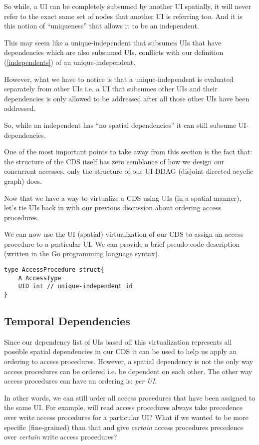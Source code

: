 So while, a UI can be completely subsumed by another UI spatially, it will never refer to the exact same set of nodes that another UI is referring too. And it is this notion of ``uniqueness'' that allows it to be an independent.

This may seem like a unique-independent that subsumes UIs that have dependencies which are also subsumed UIs, conflicts with our definition (\ref{independents}) of an unique-independent.

However, what we have to notice is that a unique-independent is evaluated separately from other UIs i.e. a UI that subsumes other UIs and their dependencies is only allowed to be addressed after all those other UIs have been addressed.

So, while an independent has ``no spatial dependencies'' it can still subsume UI-dependencies. 

One of the most important points to take away from this section is the fact that: the structure of the CDS itself has zero semblance of how we design our concurrent accesses, only the structure of our UI-DDAG (disjoint directed acyclic graph) does.

Now that we have a way to virtualize a CDS using UIs (in a spatial manner), let's tie UIs back in with our previous discussion about ordering access procedures.

We can now use the UI (spatial) virtualization of our CDS to assign an access procedure to a particular UI. We can provide a brief pseudo-code description (written in the Go programming language syntax).

\begin{verbatim}
type AccessProcedure struct{
	A AccessType
	UID int // unique-independent id
}
\end{verbatim}

\subsection{Temporal Dependencies}

Since our dependency list of UIs based off this virtualization represents all possible spatial dependencies in our CDS it can be used to help us apply an ordering to access procedures. However, a spatial dependency is not the only way access procedures can be ordered i.e. be dependent on each other. The other way access procedures can have an ordering is: \textit{per UI}.

In other words, we can still order all access procedures that have been assigned to the same UI. For example, will read access procedures always take precedence over write access procedures for a particular UI? What if we wanted to be more specific (fine-grained) than that and give \textit{certain} access procedures precedence over \textit{certain} write access procedures?

